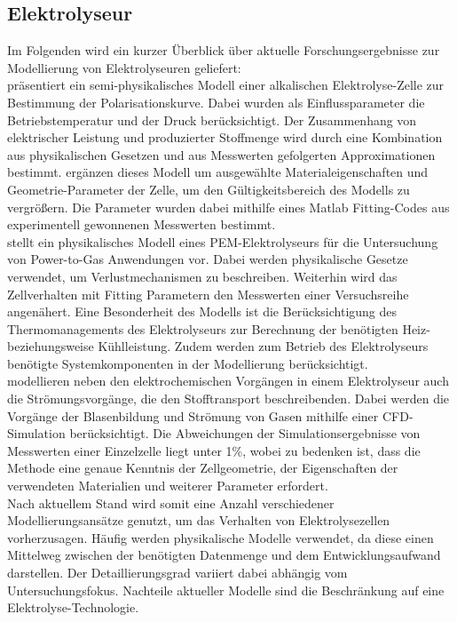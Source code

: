 \subsection{Elektrolyseur}
Im Folgenden wird ein kurzer Überblick über aktuelle Forschungsergebnisse zur Modellierung von Elektrolyseuren geliefert:\\

\citet{ulleberg_modeling_2003} präsentiert ein semi-physikalisches Modell einer alkalischen Elektrolyse-Zelle zur Bestimmung der Polarisationskurve. Dabei wurden als Einflussparameter die Betriebstemperatur und der Druck berücksichtigt. Der Zusammenhang von elektrischer Leistung und produzierter Stoffmenge wird durch eine Kombination aus physikalischen Gesetzen und aus Messwerten gefolgerten Approximationen bestimmt. \citet{amores_influence_2014} ergänzen dieses Modell um ausgewählte Materialeigenschaften und Geometrie-Parameter der Zelle, um den Gültigkeitsbereich des Modells zu vergrößern. Die Parameter wurden dabei mithilfe eines Matlab Fitting-Codes aus experimentell gewonnenen Messwerten bestimmt.\\

\citet{tjarks_pem-elektrolyse-systeme_2017} stellt ein physikalisches Modell eines PEM-Elektrolyseurs für die Untersuchung von Power-to-Gas Anwendungen vor. Dabei werden physikalische Gesetze verwendet, um Verlustmechanismen zu beschreiben. Weiterhin wird das Zellverhalten mit Fitting Parametern den Messwerten einer Versuchsreihe angenähert. Eine Besonderheit des Modells ist die Berücksichtigung des Thermomanagements des Elektrolyseurs zur Berechnung der benötigten Heiz- beziehungsweise Kühlleistung. Zudem werden zum Betrieb des Elektrolyseurs benötigte Systemkomponenten in der Modellierung berücksichtigt.\\

\citet{rodriguez_cfd_2020} modellieren neben den elektrochemischen Vorgängen in einem Elektrolyseur auch die Strömungsvorgänge, die den Stofftransport beschreibenden. Dabei werden die Vorgänge der Blasenbildung und Strömung von Gasen mithilfe einer CFD-Simulation berücksichtigt. Die Abweichungen der Simulationsergebnisse von Messwerten einer Einzelzelle liegt unter 1\%, wobei zu bedenken ist, dass die Methode eine genaue Kenntnis der Zellgeometrie, der Eigenschaften der verwendeten Materialien und weiterer Parameter erfordert.\\

Nach aktuellem Stand wird somit eine Anzahl verschiedener Modellierungsansätze genutzt, um das Verhalten von Elektrolysezellen vorherzusagen. Häufig werden physikalische Modelle verwendet, da diese einen Mittelweg zwischen der benötigten Datenmenge und dem Entwicklungsaufwand darstellen. Der Detaillierungsgrad variiert dabei abhängig vom Untersuchungsfokus. Nachteile aktueller Modelle sind die Beschränkung auf eine Elektrolyse-Technologie.

